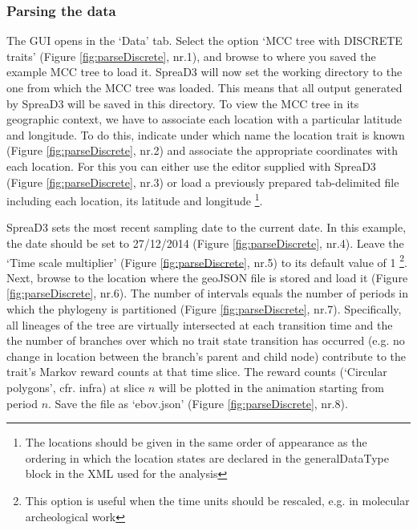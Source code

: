 \documentclass[english]{paper}
\def \spreadname {SpreaD3}
\begin{document}
\subsubsection{Parsing the data}
The GUI opens in the `Data' tab.
Select the option `MCC tree with DISCRETE traits' (Figure \ref{fig:parseDiscrete}, nr.1), and browse to where you saved the example MCC tree to load it.
{\spreadname} will now set the working directory to the one from which the MCC tree was loaded. 
This means that all output generated by {\spreadname} will be saved in this directory.
To view the MCC tree in its geographic context, we have to associate each location with a particular latitude and longitude. 
To do this, indicate under which name the location trait is known (Figure \ref{fig:parseDiscrete}, nr.2) and associate the appropriate coordinates with each location.
For this you can either use the editor supplied with {\spreadname} (Figure \ref{fig:parseDiscrete}, nr.3) or load a previously prepared tab-delimited file including each location, its latitude and longitude \footnote{The locations should be given in the same order of appearance as the ordering in which the location states are declared in the generalDataType block in the XML used for the analysis}. 
\par
{\spreadname} sets the most recent sampling date to the current date. 
In this example, the date should be set to 27/12/2014 (Figure \ref{fig:parseDiscrete}, nr.4).
Leave the `Time scale multiplier' (Figure \ref{fig:parseDiscrete}, nr.5) to its default value of 1 \footnote{This option is useful when the time units should be rescaled,  e.g. in molecular archeological work}. 
Next, browse to the location where the geoJSON file is stored and load it (Figure \ref{fig:parseDiscrete}, nr.6).
The number of intervals equals the number of periods in which the phylogeny is partitioned (Figure \ref{fig:parseDiscrete}, nr.7). %
Specifically, all lineages of the tree are virtually intersected at each transition time and the the number of branches over which no trait state transition has occurred (e.g. no change in location between the branch's parent and child node) contribute to the trait's Markov reward counts at that time slice.
The reward counts (`Circular polygons', cfr. infra) at slice $n$ will be plotted in the animation starting from period $n$.
Save the file as `ebov.json' (Figure \ref{fig:parseDiscrete}, nr.8).
\end{document}
